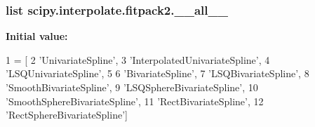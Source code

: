 \subsubsection[{\+\_\+\+\_\+all\+\_\+\+\_\+}]{\setlength{\rightskip}{0pt plus 5cm}list scipy.\+interpolate.\+fitpack2.\+\_\+\+\_\+all\+\_\+\+\_\+}\label{namespacescipy_1_1interpolate_1_1fitpack2_a3a63deac09f4132e40e857c38fcef3fa}
{\bfseries Initial value\+:}
\begin{DoxyCode}
1 = [
2     \textcolor{stringliteral}{'UnivariateSpline'},
3     \textcolor{stringliteral}{'InterpolatedUnivariateSpline'},
4     \textcolor{stringliteral}{'LSQUnivariateSpline'},
5 
6     \textcolor{stringliteral}{'BivariateSpline'},
7     \textcolor{stringliteral}{'LSQBivariateSpline'},
8     \textcolor{stringliteral}{'SmoothBivariateSpline'},
9     \textcolor{stringliteral}{'LSQSphereBivariateSpline'},
10     \textcolor{stringliteral}{'SmoothSphereBivariateSpline'},
11     \textcolor{stringliteral}{'RectBivariateSpline'},
12     \textcolor{stringliteral}{'RectSphereBivariateSpline'}]
\end{DoxyCode}
\hypertarget{namespacescipy_1_1interpolate_1_1fitpack2_aab995026c3e8606b3c472a654ae21960}{}
